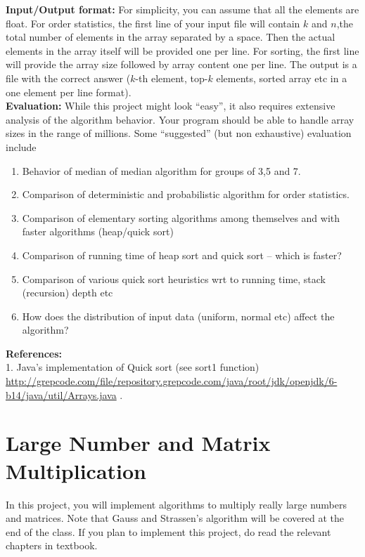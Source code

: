 \documentclass[12pt]{article}
\begin{document}
{\bf Input/Output format:} For simplicity, you can assume that all the elements are float. For order statistics, the first line of your input file will contain $k$ and $n$,the total number of elements in the array separated by a space. Then the actual elements in the array itself will be provided one per line. For sorting, the first line will provide the array size followed by array content one per line. The output is a file with the correct answer ($k$-th element, top-$k$ elements, sorted array etc in a one element per line format).\\

{\bf Evaluation:} While this project might look ``easy'', it also requires extensive analysis of the algorithm behavior. Your program should be able to handle array sizes in the range of millions. Some ``suggested'' (but non exhaustive) evaluation include 
\begin{enumerate}
\item Behavior of median of median algorithm for groups of 3,5 and 7.
\item Comparison of deterministic and probabilistic algorithm for order statistics.
\item Comparison of elementary sorting algorithms among themselves and with faster algorithms (heap/quick sort)
\item Comparison of running time of heap sort and quick sort – which is faster?
\item Comparison of various quick sort heuristics wrt to running time, stack (recursion) depth etc
\item How does the distribution of input data (uniform, normal etc) affect the algorithm?
\end{enumerate}

{\bf References:} \\
1. Java's implementation of Quick sort (see sort1 function) \url{http://grepcode.com/file/repository.grepcode.com/java/root/jdk/openjdk/6-b14/java/util/Arrays.java} . 

\section{Large Number and Matrix Multiplication}
In this project, you will implement algorithms to multiply really large numbers and matrices. 
Note that Gauss and Strassen's algorithm will be covered at the end of the class. 
If you plan to implement this project, do read the relevant chapters in textbook.\\
\end{document}
